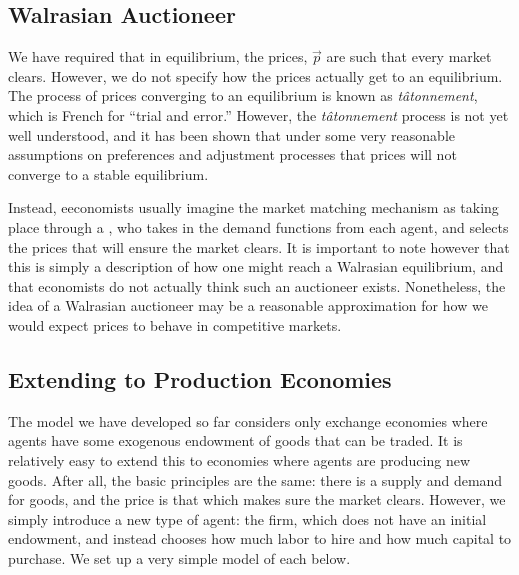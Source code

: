 \subsection*{Walrasian Auctioneer}
We have required that in equilibrium, the prices, $\vec{p}$ are such that every market clears. However, we do not specify how the prices actually get to an equilibrium. The process of prices converging to an equilibrium is known as \emph{tâtonnement}, which is French for ``trial and error.'' However, the \emph{tâtonnement} process is not yet well understood, and it has been shown that under some very reasonable assumptions on preferences and adjustment processes that prices will not converge to a stable equilibrium.

Instead, eeconomists usually imagine the market matching mechanism as taking place through a , who takes in the demand functions from each agent, and selects the prices that will ensure the market clears. It is important to note however that this is simply a description of how one might reach a Walrasian equilibrium, and that economists do not actually think such an auctioneer exists. Nonetheless, the idea of a Walrasian auctioneer may be a reasonable approximation for how we would expect prices to behave in competitive markets.

\subsection*{Extending to Production Economies}
The model we have developed so far considers only exchange economies where agents have some exogenous endowment of goods that can be traded. It is relatively easy to extend this to economies where agents are producing new goods. After all, the basic principles are the same: there is a supply and demand for goods, and the price is that which makes sure the market clears. However, we simply introduce a new type of agent: the firm, which does not have an initial endowment, and instead chooses how much labor to hire and how much capital to purchase. We set up a very simple model of each below.

